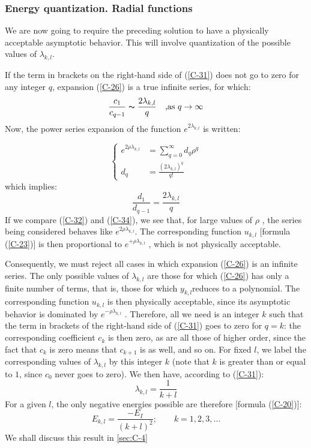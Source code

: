 \subsubsection{Energy quantization. Radial functions}
We are now going to require the preceding solution to have a physically acceptable asymptotic behavior. This will involve quantization of the possible values of $\lambda_{k,l}$.

If the term in brackets on the right-hand side of (\ref{C-31}) does not go to zero for any integer $q$, expansion (\ref{C-26}) is a true infinite series, for which:
\begin{equation}\label{C-32}
	\frac{c_1}{c_{q-1}}\thicksim \frac{2\lambda_{k,l}}{q}\quad \mbox{,as $q\to\infty$}
\end{equation}
Now, the power series expansion of the function $e^{2\lambda_{k,l}}$ is written:

\begin{equation}\label{C-33}
	\left \{
		\begin{array}{cc}
			e^{2\rho\lambda_{k,l}}&=\sum_{q=0}^\infty d_q\rho^q\\
			d_q&=\frac{(2\lambda_{k,l})^q}{q!}
		\end{array}
	\right.
\end{equation}
which implies:
\begin{equation}\label{C-34}
	\frac{d_1}{d_{q-1}}=\frac{2\lambda_{k,l}}{q}
\end{equation}
If we compare (\ref{C-32}) and (\ref{C-34}), we see that, for large values of $\rho$ , the series being considered behaves like $e^{2\rho\lambda_{k,l}}$. The corresponding function $u_{k,l}$ [formula (\ref{C-23})] is then proportional to $e^{+\rho\lambda_{k,l}}$ , which is not physically acceptable.

Consequently, we must reject all cases in which expansion (\ref{C-26}) is an infinite series. The only possible values of $\lambda_{k,l}$ are those for which (\ref{C-26}) has only a finite number of terms, that is, those for which $y_{k,l} $reduces to a polynomial. The corresponding function $u_{k,l}$ is then physically acceptable, since its asymptotic behavior is dominated by $e^{-\rho\lambda_{k,l}}$ . Therefore, all we need is an integer $k$ such that the term in brackets of the right-hand side of (\ref{C-31}) goes to zero for $q=k$: the corresponding coefficient $c_k$ is then zero, as are all those of higher order, since the fact that $c_k$ is zero means that $c_{k+1}$ is as well, and so on. For fixed $l$, we label the corresponding values of $\lambda_{k,l}$ by this integer $k$ (note that $k$ is greater than or equal to $1$, since $c_0$ never goes to zero). We then have, according to (\ref{C-31}):
\begin{equation}\label{C-35}
	\lambda_{k,l}=\frac{1}{k+l}
\end{equation}
For a given $l$, the only negative energies possible are therefore [formula (\ref{C-20})]:
\begin{equation}\label{C-36}
	E_{k,l}=\frac{-E_I}{(k+l)^2};\qquad k=1,2,3,...
\end{equation}
We shall discuss this result in \ref{sec:C-4}

